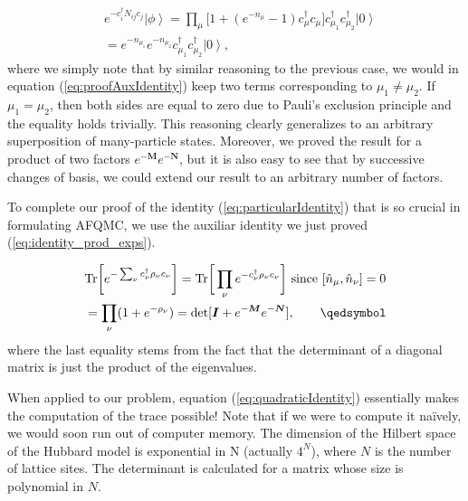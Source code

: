 \documentclass[10pt, twocolumn, twoside]{article}
\begin{document}
\begin{equation}
\begin{split}
&e^{-c_i^\dagger N_{ij} c_j} \left| \phi \right\rangle = \prod_\mu \bigg[ 1 + (e^{-n_\mu} -1 ) c_\mu^\dagger c_\mu \bigg] c_{\mu_1}^\dagger c_{\mu_2}^\dagger \left| 0 \right\rangle \\
&= e^{-n_{\mu_1}} e^{-n_{\mu_2}} c_{\mu_1}^\dagger c_{\mu_2}^\dagger \left| 0 \right\rangle ,
\end{split}
\end{equation}
where we simply note that by similar reasoning to the previous case, we would in equation (\ref{eq:proofAuxIdentity}) keep two terms corresponding to $\mu_1 \neq \mu_2$. If $\mu_1 = \mu_2$, then both sides are equal to zero due to Pauli's exclusion principle and the equality holds trivially. This reasoning clearly generalizes to an arbitrary superposition of many-particle states. Moreover, we proved the result for a product of two factors $e^{-\bm M} e^{-\bm N}$, but it is also easy to see that by successive changes of basis, we could extend our result to an arbitrary number of factors.

To complete our proof of the identity (\ref{eq:particularIdentity}) that is so crucial in formulating AFQMC, we use the auxiliar identity we just proved (\ref{eq:identity_prod_exps}).

\begin{equation}\label{eq:completeProof}
\begin{split}
&\text{Tr} \bigg[ e^{-\sum_\nu c_\nu^\dagger \rho_\nu c_\nu} \bigg] = \text{Tr} \bigg[ \prod_\nu e^{-c_\nu^\dagger \rho_\nu c_\nu } \bigg] \text{  since  } [\hat{n}_\mu, \hat{n}_\nu] = 0 \\
&= \prod_\nu ( 1 + e^{-\rho_\nu} ) = \text{det} [ \bm I + e^{-\bm M} e^{-\bm N} ], \quad\quad \qedsymbol
\end{split}
\end{equation}
where the last equality stems from the fact that the determinant of a diagonal matrix is just the product of the eigenvalues.

When applied to our problem, equation (\ref{eq:quadraticIdentity}) essentially makes the computation of the trace possible! Note that if we were to compute it na\"ively, we would soon run out of computer memory. The dimension of the Hilbert space of the Hubbard model is exponential in N (actually $4^N$), where $N$ is the number of lattice sites. The determinant is calculated for a matrix whose size is polynomial in $N$. 
\end{document}
